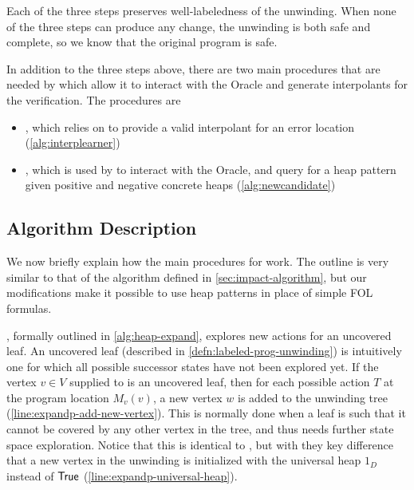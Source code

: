 Each of the three steps preserves well-labeledness of the unwinding. When none of the three steps can produce any change, the unwinding is both safe and complete, so we know that the original program is safe.

In addition to the three steps above, there are two main procedures that are needed by  which allow it to interact with the Oracle and generate interpolants for the verification. The procedures are

\begin{itemize}
  \item \seplearner, which  relies on to provide a valid interpolant for an error location (\autoref{alg:interplearner})
  \item \newcandidate, which is used by \seplearner to interact with the Oracle, and query for a heap pattern given positive and negative concrete heaps (\autoref{alg:newcandidate})
\end{itemize}

\subsection{Algorithm Description}
We now briefly explain how the main procedures for \verifier work. The outline is very similar to that of the \impact algorithm defined in \autoref{sec:impact-algorithm}, but our modifications make it possible to use heap patterns in place of simple FOL formulas.

\expand, formally outlined in \autoref{alg:heap-expand}, explores new actions for an uncovered leaf. An uncovered leaf (described in \autoref{defn:labeled-prog-unwinding}) is intuitively one for which all possible successor states have not been explored yet. If the vertex $v \in V$ supplied to \expand is an uncovered leaf, then for each possible action $T$ at the program location $M_v(v)$, a new vertex $w$ is added to the unwinding tree (\autoref{line:expandp-add-new-vertex}). This is normally done when a leaf is such that it cannot be covered by any other vertex in the tree, and thus needs further state space exploration. Notice that this is identical to \impact, but with they key difference that a new vertex in the unwinding is initialized with the universal heap $1_D$ instead of $\mathsf{True}$ (\autoref{line:expandp-universal-heap}).

